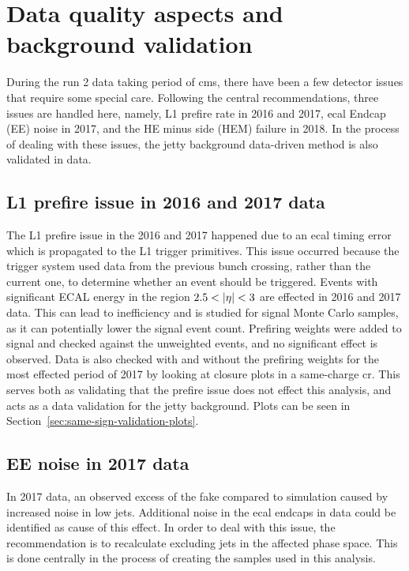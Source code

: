 \clearpage
\section{Data quality aspects and background validation}
\label{sec:data-quality}

During the run 2 data taking period of \gls{cms}, there have been a few detector issues that require some special care. Following the central recommendations, three issues are handled here, namely, L1 prefire rate in 2016 and 2017, \gls{ecal} Endcap (EE) noise in 2017, and the HE minus side (HEM) failure in 2018. In the process of dealing with these issues, the jetty background data-driven method is also validated in data. 

\subsection{L1 prefire issue in 2016 and 2017 data}

The L1 prefire issue in the 2016 and 2017 happened due to an \gls{ecal} timing error which is propagated to the L1 trigger primitives. This issue occurred because the trigger system used data from the previous bunch crossing, rather than the current one, to determine whether an event should be triggered. Events with significant ECAL energy in the region $2.5<\lvert \eta \rvert<3$ are effected in 2016 and 2017 data. This can lead to inefficiency and is studied for signal Monte Carlo samples, as it can potentially lower the signal event count. Prefiring weights were added to signal and checked against the unweighted events, and no significant effect is observed. Data is also checked with and without the prefiring weights for the most effected period of 2017 by looking at closure plots in a same-charge \gls{cr}. This serves both as validating that the prefire issue does not effect this analysis, and acts as a data validation for the jetty background. Plots can be seen in Section~\ref{sec:same-sign-validation-plots}.

\subsection{EE noise in 2017 data}

In 2017 data, an observed excess of the fake \ptmiss compared to simulation caused by increased noise in low \pt jets. Additional noise in the \gls{ecal} endcaps in data could be identified as cause of this effect. In order to deal with this issue, the recommendation is to recalculate \ptmiss excluding jets in the affected phase space. This is done centrally in the process of creating the samples used in this analysis.

